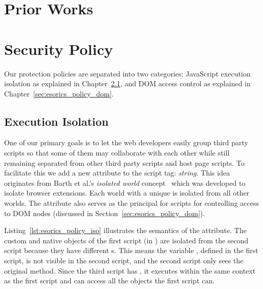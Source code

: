 \section{Prior Works}
\label{sec:esorics_related_works}

\section{Security Policy}
\label{sec:esorics_policy}

Our protection policies are separated into two categories: JavaScript execution isolation as explained in Chapter~\ref{sec:esorics_policy_iso}, and DOM access control as explained in Chapter~\ref{sec:esorics_policy_dom}.

\subsection{Execution Isolation} 
\label{sec:esorics_policy_iso}
One of our primary goals is to let the web developers easily group third party scripts so that some of them may collaborate with each other while still remaining separated from other third party scripts and host page scripts.  To facilitate this we add a new attribute to the script tag: \emph{string}.  This idea originates from Barth et al.'s \emph{isolated world} concept~\cite{extension} which was developed to isolate browser extensions.  Each world with a unique  is isolated from all other worlds.  The  attribute also serves as the principal for scripts for controlling access to DOM nodes (discussed in Section~\ref{sec:esorics_policy_dom}).
\lstset{xleftmargin=.25\textwidth,xrightmargin=.1\textwidth}


Listing~\ref{lst:esorics_policy_iso} illustrates the semantics of the  attribute.  The custom and native objects of the first script (in ) are isolated from the second script because they have different s.  This means the variable , defined in the first script, is not visible in the second script, and the second script only sees the original  method.  Since the third script has , it executes within the same context as the first script and can access all the objects the first script can.  


